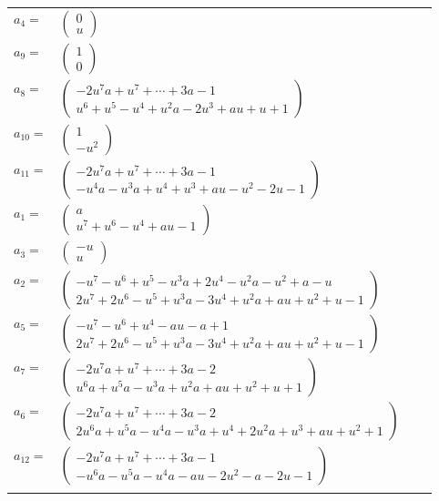 \documentclass[1p]{elsarticle_modified}
\theoremstyle{definition}
\begin{document}
\begin{tabular}{m{7pt} m{180pt} m{7pt} m{180pt} }
\flushright $a_{4}=$&$\begin{pmatrix}0\\u\end{pmatrix}$ \\
\flushright $a_{9}=$&$\begin{pmatrix}1\\0\end{pmatrix}$ \\
\flushright $a_{8}=$&$\begin{pmatrix}-2 u^7 a+u^7+\cdots+3 a-1\\u^6+u^5- u^4+u^2 a-2 u^3+a u+u+1\end{pmatrix}$ \\
\flushright $a_{10}=$&$\begin{pmatrix}1\\- u^2\end{pmatrix}$ \\
\flushright $a_{11}=$&$\begin{pmatrix}-2 u^7 a+u^7+\cdots+3 a-1\\- u^4 a- u^3 a+u^4+u^3+a u- u^2-2 u-1\end{pmatrix}$ \\
\flushright $a_{1}=$&$\begin{pmatrix}a\\u^7+u^6- u^4+a u-1\end{pmatrix}$ \\
\flushright $a_{3}=$&$\begin{pmatrix}- u\\u\end{pmatrix}$ \\
\flushright $a_{2}=$&$\begin{pmatrix}- u^7- u^6+u^5- u^3 a+2 u^4- u^2 a- u^2+a- u\\2 u^7+2 u^6- u^5+u^3 a-3 u^4+u^2 a+a u+u^2+u-1\end{pmatrix}$ \\
\flushright $a_{5}=$&$\begin{pmatrix}- u^7- u^6+u^4- a u- a+1\\2 u^7+2 u^6- u^5+u^3 a-3 u^4+u^2 a+a u+u^2+u-1\end{pmatrix}$ \\
\flushright $a_{7}=$&$\begin{pmatrix}-2 u^7 a+u^7+\cdots+3 a-2\\u^6 a+u^5 a- u^3 a+u^2 a+a u+u^2+u+1\end{pmatrix}$ \\
\flushright $a_{6}=$&$\begin{pmatrix}-2 u^7 a+u^7+\cdots+3 a-2\\2 u^6 a+u^5 a- u^4 a- u^3 a+u^4+2 u^2 a+u^3+a u+u^2+1\end{pmatrix}$ \\
\flushright $a_{12}=$&$\begin{pmatrix}-2 u^7 a+u^7+\cdots+3 a-1\\- u^6 a- u^5 a- u^4 a- a u-2 u^2- a-2 u-1\end{pmatrix}$\\&\end{tabular}
\end{document}
